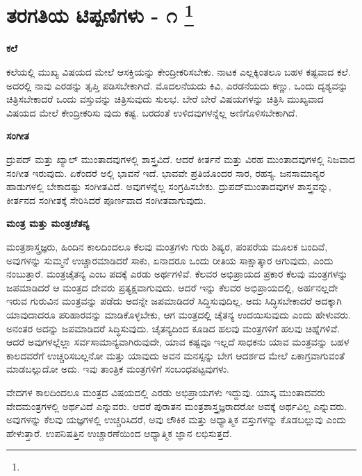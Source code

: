 
\chapter[ತರಗತಿಯ ಟಿಪ್ಪಣಿಗಳು - ೧ ]{ತರಗತಿಯ ಟಿಪ್ಪಣಿಗಳು - ೧ \protect\footnote{}}

\centerline{\textbf{ಕಲೆ}}

ಕಲೆಯಲ್ಲಿ ಮುಖ್ಯ ವಿಷಯದ ಮೇಲೆ ಆಸಕ್ತಿಯನ್ನು ಕೇಂದ್ರೀಕರಿಸಬೇಕು. ನಾಟಕ ಎಲ್ಲಕ್ಕಿಂತಲೂ ಬಹಳ ಕಷ್ಟವಾದ ಕಲೆ. ಅದರಲ್ಲಿ ನಾವು ಎರಡನ್ನು ತೃಪ್ತಿ ಪಡಿಸಬೇಕಾಗಿದೆ. ಮೊದಲನೆಯದು ಕಿವಿ, ಎರಡನೆಯದು ಕಣ್ಣು. ಒಂದು ದೃಶ್ಯವನ್ನು ಚಿತ್ರಿಸಬೇಕಾದರೆ ಒಂದು ವಸ್ತುವನ್ನು ಚಿತ್ರಿಸುವುದು ಸುಲಭ. ಬೇರೆ ಬೇರೆ ವಿಷಯಗಳನ್ನು ಚಿತ್ರಿಸಿ ಮುಖ್ಯವಾದ ವಿಷಯದ ಮೇಲೆ ಕೇಂದ್ರೀಕರಿಸು ವುದು ಕಷ್ಟ. ಬರದಂತೆ ಉಳಿದವುಗಳನ್ನೆಲ್ಲ ಅಣಿಗೊಳಿಸಬೇಕಾಗಿದೆ.

\begin{center}
\textbf{ಸಂಗೀತ}
\end{center}

ದ್ರುಪದ್​ ಮತ್ತು ಖ್ಯಾಲ್​ ಮುಂತಾದವುಗಳಲ್ಲಿ ಶಾಸ್ತ್ರವಿದೆ. ಆದರೆ ಕೀರ್ತನೆ ಮತ್ತು ವಿರಹ ಮುಂತಾದವುಗಳಲ್ಲಿ ನಿಜವಾದ ಸಂಗೀತ ಇರುವುದು. ಏಕೆಂದರೆ ಅಲ್ಲಿ ಭಾವನೆ ಇದೆ. ಭಾವವೇ ಪ್ರತಿಯೊಂದರ ಸಾರ, ರಹಸ್ಯ. ಜನಸಾಮಾನ್ಯರ ಹಾಡುಗಳಲ್ಲಿ ಬೇಕಾದಷ್ಟು ಸಂಗೀತವಿದೆ. ಅವುಗಳನ್ನೆಲ್ಲ ಸಂಗ್ರಹಿಸಬೇಕು. ದ್ರುಪದ್​ ಮುಂತಾದವುಗಳ ಶಾಸ್ತ್ರವನ್ನು, ಕೀರ್ತನದ ಸಂಗೀತಕ್ಕೆ ಸೇರಿಸಿದರೆ ಪೂರ್ಣವಾದ ಸಂಗೀತವಾಗುವುದು.

\begin{center}
\textbf{ಮಂತ್ರ ಮತ್ತು ಮಂತ್ರಚೆತನ್ಯ}
\end{center}

ಮಂತ್ರಶಾಸ್ತ್ರಜ್ಞರು, ಹಿಂದಿನ ಕಾಲದಿಂದಲೂ ಕೆಲವು ಮಂತ್ರಗಳು ಗುರು ಶಿಷ್ಯರ, ಪಂಪರೆಯ ಮೂಲಕ ಬಂದಿವೆ, ಅವುಗಳನ್ನು ಸುಮ್ಮನೆ ಉಚ್ಚಾರಮಾಡಿದರೆ ಸಾಕು, ಏನಾದರೂ ಒಂದು ರೀತಿಯ ಸಾಕ್ಷಾತ್ಕಾರ ಆಗುವುದು, ಎಂದು ನಂಬುತ್ತಾರೆ. ಮಂತ್ರಚೈತನ್ಯ ಎಂಬ ಪದಕ್ಕೆ ಎರಡು ಅರ್ಥಗಳಿವೆ. ಕೆಲವರ ಅಭಿಪ್ರಾಯದ ಪ್ರಕಾರ ಕೆಲವು ಮಂತ್ರಗಳನ್ನು ಜಪಮಾಡಿದರೆ ಆ ಮಂತ್ರದ ದೇವರು ಪ್ರತ್ಯಕ್ಷವಾಗುವುದು. ಆದರೆ ಇನ್ನು ಕೆಲವರ ಅಭಿಪ್ರಾಯದಲ್ಲಿ, ಅರ್ಹನಲ್ಲದೇ ಇರುವ ಗುರುವಿನ ಮಂತ್ರವನ್ನು ಪಡೆದು ಅದನ್ನೇ ಜಪಮಾಡಿದರೆ ಸಿದ್ಧಿಸುವುದಿಲ್ಲ. ಅದು ಸಿದ್ಧಿಸಬೇಕಾದರೆ ಅದಕ್ಕಾಗಿ ಯಾವುದಾದರೂ ಪರಿಹಾರವನ್ನು ಮಾಡಿಕೊಳ್ಳಬೇಕು, ಆಗ ಮಂತ್ರದಲ್ಲಿ ಚೈತನ್ಯ ಉದಯಿಸುವುದು ಎಂದು ಹೇಳುವರು. ಅನಂತರ ಅದನ್ನು ಜಪಮಾಡಿದರೆ ಸಿದ್ಧಿಸುವುದು. ಚೈತನ್ಯದಿಂದ ಕೂಡಿದ ಹಲವು ಮಂತ್ರಗಳಿಗೆ ಹಲವು ಚಿಹ್ನೆಗಳಿವೆ. ಆದರೆ ಅವುಗಳಲ್ಲೆಲ್ಲಾ ಸರ್ವಸಾಮಾನ್ಯವಾಗಿರುವುದೇ, ಯಾವ ಕಷ್ಟವೂ ಇಲ್ಲದೆ ಸಾಧಕನು ಯಾವ ಮಂತ್ರವನ್ನು ಬಹಳ ಕಾಲದವರೆಗೆ ಉಚ್ಚರಿಸಬಲ್ಲನೋ ಮತ್ತು ಯಾವುದು ಅವನ ಮನಸ್ಸನ್ನು ಬೇಗ ಆದರ್ಶದ ಮೇಲೆ ಏಕಾಗ್ರವಾಗುವಂತೆ ಮಾಡಬಲ್ಲುದೋ ಅದು. ಇವು ತಾಂತ್ರಿಕ ಮಂತ್ರಗಳಿಗೆ ಸಂಬಂಧಪಟ್ಟವುಗಳು.

ವೇದಗಳ ಕಾಲದಿಂದಲೂ ಮಂತ್ರದ ವಿಷಯದಲ್ಲಿ ಎರಡು ಅಭಿಪ್ರಾಯಗಳು ಇದ್ದುವು. ಯಾಸ್ಕ ಮುಂತಾದವರು ವೇದಮಂತ್ರಗಳಲ್ಲಿ ಅರ್ಥವಿದೆ ಎನ್ನುವರು. ಆದರೆ ಪುರಾತನ ಮಂತ್ರಶಾಸ್ತ್ರಜ್ಞರಾದರೋ ಅವಕ್ಕೆ ಅರ್ಥವಿಲ್ಲ ಎನ್ನುವರು. ಅವುಗಳನ್ನು ಕೆಲವು ಯಜ್ಞಗಳಲ್ಲಿ ಉಚ್ಚರಿಸಿದರೆ, ಅವು ಲೌಕಿಕ ಮತ್ತು ಅಧ್ಯಾತ್ಮಿಕ ವಸ್ತುಗಳನ್ನು ಕೊಡಬಲ್ಲುವು ಎಂದು ಹೇಳುತ್ತಾರೆ. ಉಪನಿಷತ್ತಿನ ಉಚ್ಚಾರಣೆಯಿಂದ ಆಧ್ಯಾತ್ಮಿಕ ಜ್ಞಾನ ಲಭಿಸುತ್ತದೆ.

